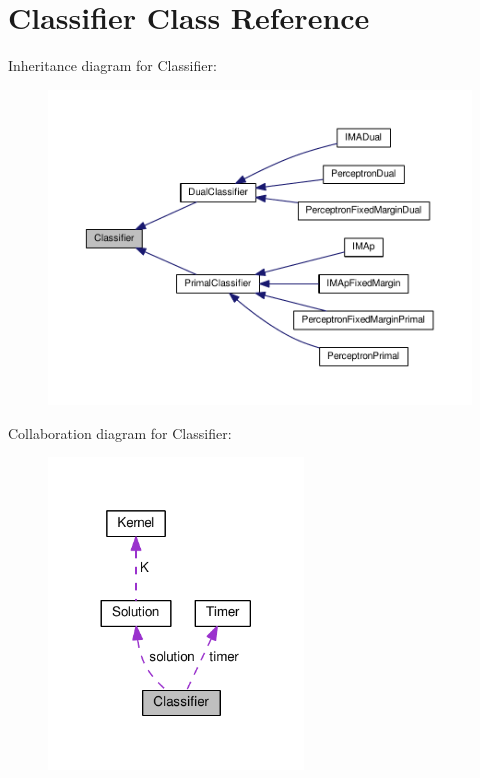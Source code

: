\hypertarget{class_classifier}{}\section{Classifier Class Reference}
\label{class_classifier}


Inheritance diagram for Classifier\+:
\nopagebreak
\begin{figure}[H]
\begin{center}
\leavevmode
\includegraphics[width=350pt]{class_classifier__inherit__graph}
\end{center}
\end{figure}


Collaboration diagram for Classifier\+:
\nopagebreak
\begin{figure}[H]
\begin{center}
\leavevmode
\includegraphics[width=192pt]{class_classifier__coll__graph}
\end{center}
\end{figure}
